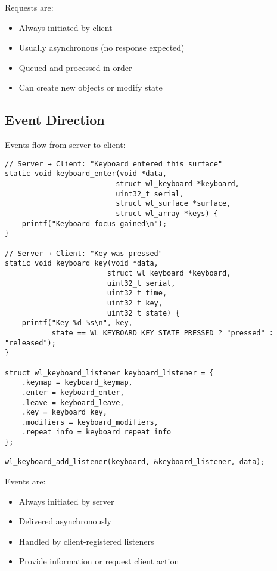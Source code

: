 Requests are:
\begin{itemize}
    \item Always initiated by client
    \item Usually asynchronous (no response expected)
    \item Queued and processed in order
    \item Can create new objects or modify state
\end{itemize}

\subsection{Event Direction}

Events flow from server to client:

\begin{lstlisting}[style=cstyle, caption=Server Events]
// Server → Client: "Keyboard entered this surface"
static void keyboard_enter(void *data,
                          struct wl_keyboard *keyboard,
                          uint32_t serial,
                          struct wl_surface *surface,
                          struct wl_array *keys) {
    printf("Keyboard focus gained\n");
}

// Server → Client: "Key was pressed"
static void keyboard_key(void *data,
                        struct wl_keyboard *keyboard,
                        uint32_t serial,
                        uint32_t time,
                        uint32_t key,
                        uint32_t state) {
    printf("Key %d %s\n", key,
           state == WL_KEYBOARD_KEY_STATE_PRESSED ? "pressed" : "released");
}

struct wl_keyboard_listener keyboard_listener = {
    .keymap = keyboard_keymap,
    .enter = keyboard_enter,
    .leave = keyboard_leave,
    .key = keyboard_key,
    .modifiers = keyboard_modifiers,
    .repeat_info = keyboard_repeat_info
};

wl_keyboard_add_listener(keyboard, &keyboard_listener, data);
\end{lstlisting}

Events are:
\begin{itemize}
    \item Always initiated by server
    \item Delivered asynchronously
    \item Handled by client-registered listeners
    \item Provide information or request client action
\end{itemize}

